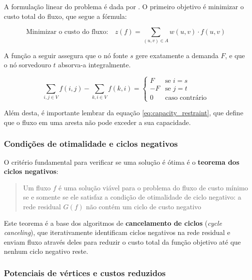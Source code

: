A formulação linear do problema é dada por . O primeiro objetivo é minimizar o custo total do fluxo, que segue a fórmula:

\begin{equation}
    \text{Minimizar o custo do fluxo:}\quad z(f) = \sum_{(u,v)\in A} w(u,v) \cdot f(u,v)
\end{equation}

A função a seguir assegura que o nó fonte $s$ gere exatamente a demanda $F$, e que o nó sorvedouro $t$ absorva-a integralmente. 

\begin{equation}
    \sum_{i,j\in V}f(i,j) - \sum_{k,i\in V}f(k,i) = 
        \begin{cases}
            F  & \text{se } i = s \\
            -F & \text{se } j = t \\
            0  & \text{caso contrário}
        \end{cases}
\end{equation}

Além desta, é importante lembrar da equação \ref{eq:capacity_restraint}, que define que o fluxo em uma aresta não pode exceder a sua capacidade.

\subsubsection{Condições de otimalidade e ciclos negativos}

O critério fundamental para verificar se uma solução é ótima é o \textbf{teorema dos ciclos negativos}:

\begin{quotation}
    Um fluxo $f$ é uma solução viável para o problema do fluxo de custo mínimo se e somente se ele satisfaz a condição de otimalidade de ciclo negativo: a rede residual $G(f)$ não contém um ciclo de custo negativo \cite{ahuja}
\end{quotation}

Este teorema é a base dos algoritmos de \textbf{cancelamento de ciclos} (\textit{cycle canceling}), que iterativamente identificam ciclos negativos na rede residual e enviam fluxo através deles para reduzir o custo total da função objetivo até que nenhum ciclo negativo reste.

\subsubsection{Potenciais de vértices e custos reduzidos}
\label{p:potenciais_fluxo}

